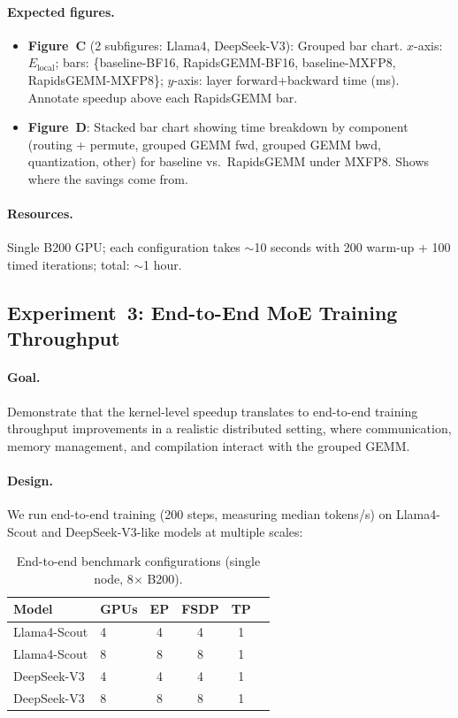 \documentclass[11pt,a4paper]{article}
\theoremstyle{definition}
\begin{document}
\paragraph{Expected figures.}
\begin{itemize}
  \item \textbf{Figure~C} (2 subfigures: Llama4, DeepSeek-V3):
    Grouped bar chart.
    $x$-axis: $E_{\text{local}}$; bars: \{baseline-BF16,
    RapidsGEMM-BF16, baseline-MXFP8, RapidsGEMM-MXFP8\};
    $y$-axis: layer forward+backward time (ms).
    Annotate speedup above each RapidsGEMM bar.
  \item \textbf{Figure~D}:
    Stacked bar chart showing time breakdown by component
    (routing + permute, grouped GEMM fwd, grouped GEMM bwd,
    quantization, other) for baseline vs.\ RapidsGEMM under MXFP8.
    Shows where the savings come from.
\end{itemize}

\paragraph{Resources.}
Single B200 GPU; each configuration takes $\sim$10 seconds with
200 warm-up + 100 timed iterations; total: $\sim$1 hour.

\subsection{Experiment~3: End-to-End MoE Training Throughput}
\label{sec:exp-e2e}

\paragraph{Goal.}
Demonstrate that the kernel-level speedup translates to end-to-end
training throughput improvements in a realistic distributed setting,
where communication, memory management, and compilation interact with
the grouped GEMM.

\paragraph{Design.}
We run end-to-end training (200 steps, measuring median tokens/s)
on Llama4-Scout and DeepSeek-V3-like models at multiple scales:

\begin{table}[h]
\centering
\small
\caption{End-to-end benchmark configurations (single node, 8$\times$ B200).}
\label{tab:e2e-configs}
\begin{tabular}{@{}llcccc@{}}
\toprule
Model & GPUs & EP & FSDP & TP \\
\midrule
Llama4-Scout & 4 & 4 & 4 & 1 \\
Llama4-Scout & 8 & 8 & 8 & 1 \\
\midrule
DeepSeek-V3 & 4 & 4 & 4 & 1 \\
DeepSeek-V3 & 8 & 8 & 8 & 1 \\
\bottomrule
\end{tabular}
\end{table}
\end{document}
